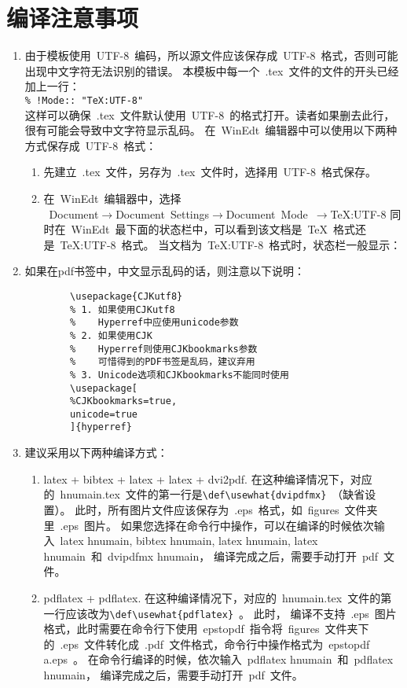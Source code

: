 \section{编译注意事项}
\begin{enumerate}
  \item 由于模板使用~UTF-8~编码，所以源文件应该保存成~UTF-8~格式，否则可能出现中文字符无法识别的错误。
  本模板中每一个~.tex~文件的文件的开头已经加上一行：\\
    \verb|% !Mode:: "TeX:UTF-8"|\\
     这样可以确保~.tex~文件默认使用~UTF-8~的格式打开。读者如果删去此行，很有可能会导致中文字符显示乱码。
     在~WinEdt~编辑器中可以使用以下两种方式保存成~UTF-8~格式：
      \begin{enumerate}
        \item 先建立~.tex~文件，另存为~.tex~文件时，选择用~UTF-8~格式保存。
        \item
            在~WinEdt~编辑器中，选择\\
            \mbox{~Document$\to$Document Settings$\to$Document Mode $\to$TeX:UTF-8} 同时在~WinEdt~最下面的状态栏中，可以看到该文档是~TeX~格式还是~TeX:UTF-8~格式。
            当文档为~TeX:UTF-8~格式时，状态栏一般显示：
      \end{enumerate}
  \item 如果在pdf书签中，中文显示乱码的话，则注意以下说明：
    \begin{verbatim}
        \usepackage{CJKutf8}
        % 1. 如果使用CJKutf8
        %    Hyperref中应使用unicode参数
        % 2. 如果使用CJK
        %    Hyperref则使用CJKbookmarks参数
        %    可惜得到的PDF书签是乱码，建议弃用
        % 3. Unicode选项和CJKbookmarks不能同时使用
        \usepackage[
        %CJKbookmarks=true,
        unicode=true
        ]{hyperref}
     \end{verbatim}
 \item 建议采用以下两种编译方式：
  \begin{enumerate}
     \item latex + bibtex + latex + latex + dvi2pdf. 在这种编译情况下，对应的~hnumain.tex~文件的第一行是\verb|\def\usewhat{dvipdfmx}|~（缺省设置）。 此时，所有图片文件应该保存为~.eps~格式，如~figures~文件夹里~.eps~图片。
          如果您选择在命令行中操作，可以在编译的时候依次输入~latex hnumain, bibtex hnumain, latex hnumain, latex hnumain~和~dvipdfmx hnumain， 编译完成之后，需要手动打开~pdf~文件。
     \item pdflatex + pdflatex. 在这种编译情况下，对应的~hnumain.tex~文件的第一行应该改为\verb|\def\usewhat{pdflatex}|~。 此时， 编译不支持~.eps~图片格式，此时需要在命令行下使用~epstopdf~指令将~figures~文件夹下 的~.eps~文件转化成~.pdf~文件格式，命令行中操作格式为~epstopdf a.eps~。
          在命令行编译的时候，依次输入~pdflatex hnumain~和~pdflatex hnumain， 编译完成之后，需要手动打开~pdf~文件。
  \end{enumerate}
\end{enumerate}

